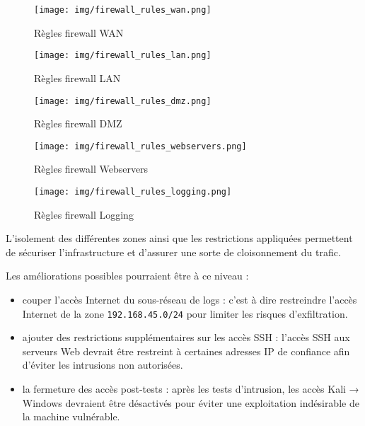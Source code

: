 \documentclass[a4paper,12pt]{report}
\begin{document}
\begin{figure}[H] 
\label{firewall_rules_wan}
    \centering
    \texttt{[image: img/firewall\_rules\_wan.png]} 
    \caption{Règles firewall WAN}
\end{figure}


\begin{figure}[H] 
\label{firewall_rules_lan}
    \centering
    \texttt{[image: img/firewall\_rules\_lan.png]} 
    \caption{Règles firewall LAN}
\end{figure}

\begin{figure}[H] 
\label{firewall_rules_dmz}
    \centering
    \texttt{[image: img/firewall\_rules\_dmz.png]} 
    \caption{Règles firewall DMZ}
\end{figure}

\begin{figure}[H] 
\label{firewall_rules_webserver}
    \centering
    \texttt{[image: img/firewall\_rules\_webservers.png]} 
    \caption{Règles firewall Webservers}
\end{figure}

\begin{figure}[H] 
\label{firewall_rules_logging}
    \centering
    \texttt{[image: img/firewall\_rules\_logging.png]} 
    \caption{Règles firewall Logging}
\end{figure}

L'isolement des différentes zones ainsi que les restrictions appliquées permettent de sécuriser l'infrastructure et d'assurer une sorte de cloisonnement du trafic.

Les améliorations possibles pourraient être à ce niveau :
\begin{itemize}
    \item couper l'accès Internet du sous-réseau de logs : c'est à dire restreindre l’accès Internet de la zone \texttt{192.168.45.0/24} pour limiter les risques d’exfiltration.
    \item ajouter des restrictions supplémentaires sur les accès SSH : l’accès SSH aux serveurs Web devrait être restreint à certaines adresses IP de confiance afin d’éviter les intrusions non autorisées.
    \item la fermeture des accès post-tests : après les tests d’intrusion, les accès Kali → Windows devraient être désactivés pour éviter une exploitation indésirable de la machine vulnérable.
\end{itemize}
\end{document}
